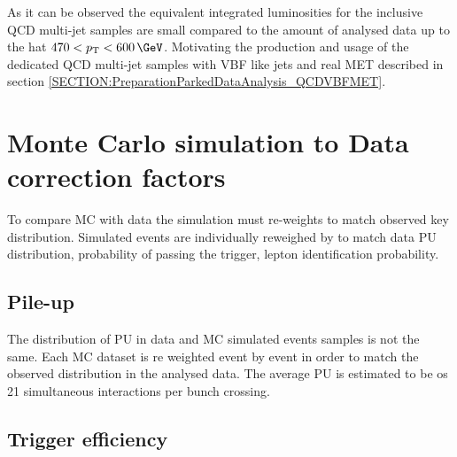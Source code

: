 As it can be observed the equivalent integrated luminosities for the inclusive \gls{QCD} multi-jet samples are small compared to the amount of analysed data up to the \pt hat $470<\pt<600\,\GeV$. Motivating the production and usage of the dedicated \gls{QCD} multi-jet samples with \gls{VBF} like jets and real \gls{MET} described in section \ref{SECTION:PreparationParkedDataAnalysis_QCDVBFMET}.

\section{Monte Carlo simulation to Data correction factors}


To compare \gls{MC} with data the simulation must re-weights to match observed key distribution. Simulated events are individually reweighed by  to match data \gls{PU} distribution, probability of passing the trigger, lepton identification probability.

\subsection{Pile-up}


The distribution of \gls{PU} in data and \gls{MC} simulated events samples is not the same. Each \gls{MC} dataset is re weighted event by event in order to match the observed distribution in the analysed data. The average \gls{PU} is estimated to be os 21 simultaneous interactions per bunch crossing. 

\subsection{Trigger efficiency}
\label{SUBSECTION:ParkedDataAnalysis_CorrectionFactors_TriggerEfficiency}


